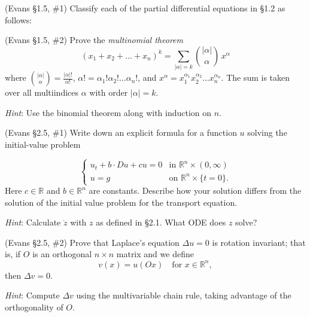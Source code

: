 \documentclass[12pt,fleqn]{exam}
\newcommand{\R}{\ensuremath{\mathbb{R}}}
\begin{document}
\begin{questions}

\question (Evans \S1.5, \#1) Classify each of the partial differential equations in \S1.2 as follows:


\question (Evans \S1.5, \#2) Prove the \emph{multinomial theorem}
\[(x_1 + x_2 + \dots + x_n)^k = \sum_{|\alpha| = k} \binom{|\alpha|}{\alpha}\,x^\alpha\]
where $\binom{|\alpha|}{\alpha} = \frac{|\alpha|!}{\alpha!}$, $\alpha! = \alpha_1!\alpha_2!\dots \alpha_n!$, and $x^\alpha = x_1^{\alpha_1} x_2^{\alpha_2} \dots x_n^{\alpha_n}$. The sum is taken over all multiindices $\alpha$ with order $|\alpha| = k$.

\emph{Hint}: Use the binomial theorem along with induction on $n$.

\question (Evans \S2.5, \#1) Write down an explicit formula for a function $u$ solving the initial-value problem

\[\begin{cases}
u_t + b \cdot Du + cu = 0 & \text{in } \R^n \times (0, \infty) \\
u = g & \text{on } \mathbb{R}^n \times \{t = 0\}.
\end{cases}\]
Here $c \in \R$ and $b \in \R^n$ are constants. Describe how your solution differs from the solution of the initial value problem for the transport equation.

\emph{Hint}: Calculate $\dot{z}$ with $z$ as defined in \S2.1. What ODE does $z$ solve? 

\question (Evans \S2.5, \#2) Prove that Laplace's equation $\Delta u = 0$ is rotation invariant; that is, if $O$ is an orthogonal $n \times n$ matrix and we define
\[v(x) = u(Ox) \quad\text{for } x \in \R^n,\]
then $\Delta v = 0$.

\emph{Hint}: Compute $\Delta v$ using the multivariable chain rule, taking advantage of the orthogonality of $O$.

\end{questions}
\end{document}
